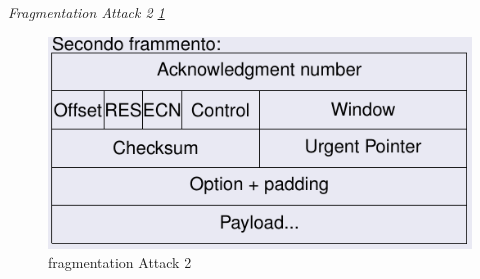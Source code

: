 \documentclass[12pt]{article}
\begin{document}
				\textit{Fragmentation Attack 2 \ref{fig:28}}\\
				\begin{figure}[h!]
					\centering
					\includegraphics[scale=0.60]{img/frag2.PNG}
					\caption{fragmentation Attack 2 \label{fig:28}}
				\end{figure}\\
				
\end{document}
